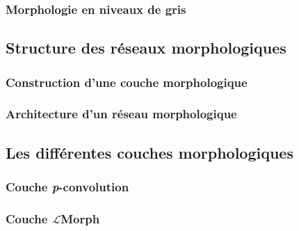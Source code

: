 \documentclass[12pt, twoside, letterpaper, french]{article}
\begin{document}
\subsubsection{Morphologie en niveaux de gris}
\vspace{0.2cm}

\newpage

\subsection{Structure des réseaux morphologiques} %

\subsubsection{Construction d'une couche morphologique}
\vspace{0.2cm}

\newpage

\subsubsection{Architecture d'un réseau morphologique}
\vspace{0.2cm}

\newpage

\subsection{Les différentes couches morphologiques} %

\subsubsection{Couche \textit{p}-convolution}
\vspace{0.2cm}

\newpage

\subsubsection{Couche $\mathcal{L}$Morph}
\vspace{0.2cm}

\newpage
\end{document}
